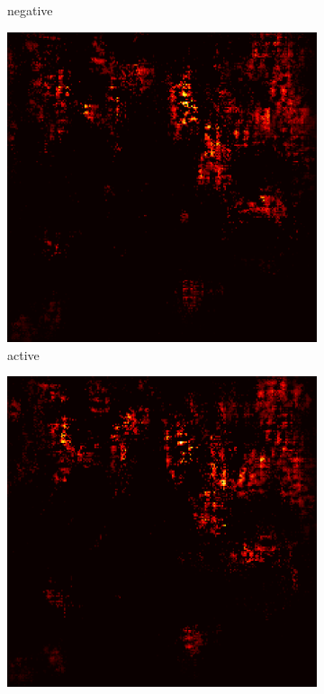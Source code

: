 \documentclass[preprint,12pt]{elsarticle}
\begin{document}
\begin{figure}
\begin{subfigure}{0.14\textwidth}
        \caption{negative}
    \end{subfigure}
    \hfill
    \begin{subfigure}{0.14\textwidth}
        \centering
        \includegraphics[width=\linewidth]{../visualizations/examples/imagenette/cnn/active_saliency_map/1.png}
        \caption{active}
    \end{subfigure}
    \hfill
    \begin{subfigure}{0.14\textwidth}
        \centering
        \includegraphics[width=\linewidth]{../visualizations/examples/imagenette/cnn/inactive_saliency_map/1.png}

\end{subfigure}
\end{figure}
\end{document}
